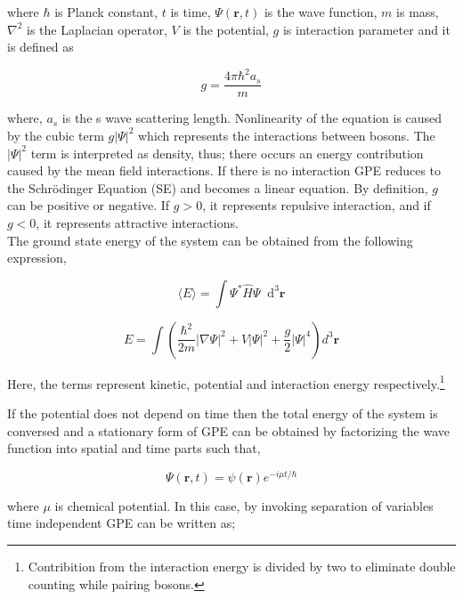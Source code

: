 \documentclass[a4paper,times,hidelinks,12pt]{article}
\newcommand*\dif{\mathop{}\!\mathrm{d}}
\begin{document}
\noindent where $\hbar$ is Planck constant, $t$ is time, $\Psi(\boldsymbol{r}, t)$ is the wave function, $m$ is mass, $\nabla^2$ is the Laplacian operator, $V$ is the potential, $g$ is interaction parameter and it is defined as 

\begin{equation}
\label{eq:GPE_inter_param}
g=\frac{4\pi\hbar^2a_s}{m}
\end{equation}

\noindent where, $a_s$ is the s wave scattering length. Nonlinearity of the equation is caused by the cubic term $g|\Psi|^2$ which represents the interactions between bosons. The $|\Psi|^2$ term is interpreted as density, thus; there occurs an energy contribution caused by the mean field interactions. If there is no interaction GPE reduces to the Schr{\"o}dinger Equation (SE) and becomes a linear equation. By definition, $g$ can be positive or negative. If $g > 0$, it represents repulsive interaction, and if $g < 0$, it represents attractive interactions\cite{barenghi2016primer}. \\

The ground state energy of the system can be obtained from the following expression, 

\begin{equation}
\label{GPE_total_energy_general}
\langle E \rangle = \int \Psi^{*}\hat{H}\Psi \dif^3\boldsymbol{r}
\end{equation}

\begin{equation}
\label{GPE_total_energy}
E = \int \left(\frac {\hbar^2}{2m}|\nabla
\Psi|^2 + V|\Psi|^2 + \frac{g}{2}|\Psi|^4 \right) d^3\boldsymbol{r}
\end{equation}

Here, the terms represent kinetic, potential and interaction energy respectively.\footnote{Contribition from the interaction energy is divided by two to eliminate double counting while pairing bosons.}  

If the potential does not depend on time then the total energy of the system is conversed and a stationary form of GPE can be obtained by factorizing the wave function into spatial and time parts such that,

\begin{equation}
\label{eq:GPE_time_indep_wave_func}
\Psi(\boldsymbol{r}, t) = \psi(\boldsymbol{r})e^{-i\mu t/\hbar}
\end{equation}

where $\mu$ is chemical potential. In this case, by invoking separation of variables time independent GPE can be written as;
\end{document}
